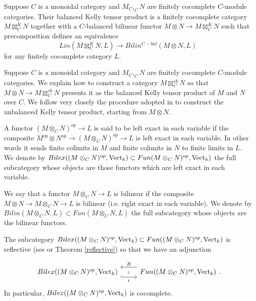 \begin{definition}
  \noindent Suppose $C$ is a monoidal category and $M_C, _{C}N$ are finitely
  cocomplete $C$-module categories. Their balanced Kelly tensor product is a
  finitely cocomplete category $M\boxtimes^K_C N$ together with a $C$-balanced
  bilinear functor $M\otimes N\to M\boxtimes^K_C N$ such that precomposition
  defines an equivalence $$Lin(M\boxtimes^K_C N,L)\to Bilin^{C-bal}(M\otimes
  N, L)$$ for any finitely cocomplete category $L$.
\end{definition}

Suppose $C$ is a monoidal category and $M_C, _{C}N$ are finitely cocomplete
$C$-module categories. We explain how to construct a category
$M\boxtimes_C^{sk}N$ so that $M\otimes N\to M\boxtimes_C^{sk}N$ presents it as
the balanced Kelly tensor product of $M$ and $N$ over $C$. We follow very
closely the procedure adopted in \cite{lopezfranco/tensor-products} to
construct the unbalanced Kelly tensor product, starting from $M\otimes N$.

\begin{definition}

  \noindent A functor $(M\otimes_C N)^{op}\to L$ is said to be left exact in
  each variable if the composite $M^{op}\otimes N^{op}\to (M\otimes_C
  N)^{op}\to L$ is left exact in each variable. In other words it sends finite
  colimits in $M$ and finite colimits in $N$ to finite limits in $L$. We
  denote by $Bilex((M\otimes_C N)^{op},\operatorname{Vect}_k)\subset Fun(M\otimes_C
  N)^{op},\operatorname{Vect}_k)$ the full subcategory whose objects are those functors
  which are left exact in each variable.
\end{definition}

\begin{definition}

  \noindent We say that a functor $M\otimes_C N \to L$ is bilinear if the
  composite $M\otimes N\to M\otimes_C N \to L$ is bilinear (i.e. right exact
  in each variable). We denote by $Bilin(M\otimes_C N, L)\subset
  Fun(M\otimes_C N, L)$ the full subcategory whose objects are the bilinear
  functors.
\end{definition}

The subcategory $Bilex((M\otimes_C N)^{op},\operatorname{Vect}_k)\subset Fun((M\otimes_C
N)^{op},\operatorname{Vect}_k)$ is reflective (see \cite[Theorem
  6.5]{kelly/basic-concepts-enriched} or Theorem \ref{reflective}) so that we
have an adjunction

\[\begin{tikzcd}
            {Bilex((M\otimes_C N)^{op},\Vect_k)} & {Fun((M\otimes_C N)^{op},\Vect_k)}
            \arrow[""{name=0, anchor=center, inner sep=0}, "i"', shift right=3, hook, from=1-1, to=1-2]
            \arrow[""{name=1, anchor=center, inner sep=0}, "R"', shift right=3, from=1-2, to=1-1]
            \arrow["\dashv"{anchor=center, rotate=-90}, draw=none, from=1, to=0]
\end{tikzcd}.\]
In particular, $Bilex((M\otimes_C N)^{op},\operatorname{Vect}_k)$ is cocomplete.

